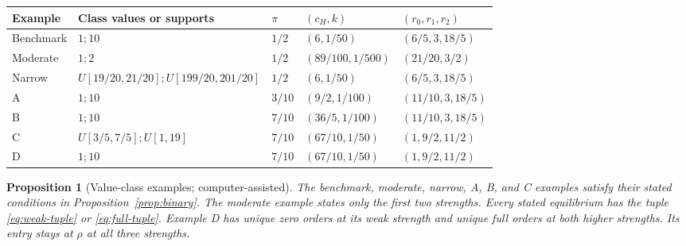\documentclass[12pt]{article}
\newtheorem{proposition}{Proposition}
\begin{document}
\begin{center}\small\setlength{\tabcolsep}{4pt}
\begin{tabular}{lllll}
\toprule
Example & Class values or supports & $\pi$ & $(c_H,k)$ & $(r_0,r_1,r_2)$\\\midrule
Benchmark & $1;10$ & $1/2$ & $(6,1/50)$ & $(6/5,3,18/5)$\\
Moderate & $1;2$ & $1/2$ & $(89/100,1/500)$ & $(21/20,3/2)$\\
Narrow & $U[19/20,21/20];U[199/20,201/20]$ & $1/2$ & $(6,1/50)$ & $(6/5,3,18/5)$\\
A & $1;10$ & $3/10$ & $(9/2,1/100)$ & $(11/10,3,18/5)$\\
B & $1;10$ & $7/10$ & $(36/5,1/100)$ & $(11/10,3,18/5)$\\
C & $U[3/5,7/5];U[1,19]$ & $7/10$ & $(67/10,1/50)$ & $(1,9/2,11/2)$\\
D & $1;10$ & $7/10$ & $(67/10,1/50)$ & $(1,9/2,11/2)$\\\bottomrule
\end{tabular}
\end{center}

\begin{proposition}[Value-class examples; computer-assisted]\label{prop:examples}
The benchmark, moderate, narrow, A, B, and C examples satisfy their stated conditions in Proposition~\ref{prop:binary}.
The moderate example states only the first two strengths.
Every stated equilibrium has the tuple \eqref{eq:weak-tuple} or \eqref{eq:full-tuple}.
Example D has unique zero orders at its weak strength and unique full orders at both higher strengths.
Its entry stays at $\rho$ at all three strengths.
\end{proposition}
\end{document}
